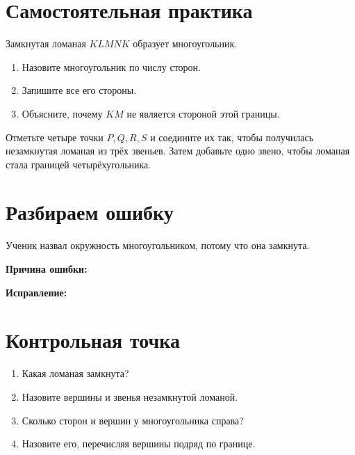 \section{Самостоятельная практика}

\begin{practicebox}
  Замкнутая ломаная $KLMNK$ образует многоугольник.
  \begin{enumerate}[label=\alph*)]
    \item Назовите многоугольник по числу сторон. \answerblank[32mm]
    \item Запишите все его стороны. \answerblank[85mm]
    \item Объясните, почему $KM$ не является стороной этой границы.
  \end{enumerate}
\end{practicebox}

\begin{practicebox}[4. Постройте]
  Отметьте четыре точки $P,Q,R,S$ и соедините их так, чтобы получилась
  незамкнутая ломаная из трёх звеньев. Затем добавьте одно звено, чтобы
  ломаная стала границей четырёхугольника.
\end{practicebox}

\section{Разбираем ошибку}

\begin{warningbox}
  Ученик назвал окружность многоугольником, потому что она замкнута.

  \textbf{Причина ошибки:} \answerblank[100mm]

  \textbf{Исправление:} \answerblank[100mm]
\end{warningbox}

\section{Контрольная точка}

\openclosedfigure

\begin{checkpointbox}
  \begin{enumerate}[label=\textbf{\arabic*.}]
    \item Какая ломаная замкнута? \answerblank[30mm]
    \item Назовите вершины и звенья незамкнутой ломаной. 
    \item Сколько сторон и вершин у многоугольника справа?
      \answerblank[35mm]
    \item Назовите его, перечисляя вершины подряд по границе.
      \answerblank[45mm]
  \end{enumerate}
\end{checkpointbox}

